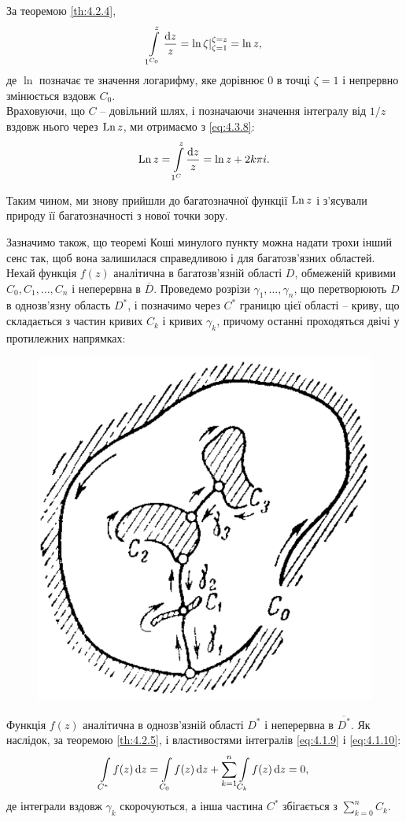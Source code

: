 \begin{example}
	За теоремою \ref{th:4.2.4}, 
	\begin{equation}
		\label{eq:4.3.8}
		\displaystyle\int\limits_{1^{C_0}}^z \frac{\mathop{}\!\mathrm{d} z}{z} = \ln \zeta|_{\zeta=1}^{\zeta=z} = \ln z,
	\end{equation}
	де $\ln$ позначає те значення логарифму, яке дорівнює 0 в точці $\zeta = 1$ і непрервно змінюється вздовж $C_0$. \\

	Враховуючи, що $C$ -- довільний шлях, і позначаючи значення інтегралу від $1/z$ вздовж нього через $\operatorname{Ln} z$, ми отримаємо з \eqref{eq:4.3.8}:
	\begin{equation}
		\label{eq:4.3.9}
		\operatorname{Ln} z = \displaystyle\int\limits_{1^C}^z \frac{\mathop{}\!\mathrm{d} z}{z} = \ln z + 2 k \pi i.
	\end{equation}

	Таким чином, ми знову прийшли до багатозначної функції $\operatorname{Ln} z$ і з'ясували природу її багатозначності з нової точки зору.
\end{example}

Зазначимо також, що теоремі Коші минулого пункту можна надати трохи інший сенс так, щоб вона залишилася справедливою і для багатозв'язних областей. Нехай функція $f(z)$ аналітична в багатозв'язній області $D$, обмеженій кривими $C_0, C_1, \ldots, C_n$ і неперервна в $\overline{D}$. Проведемо розрізи $\gamma_1, \ldots, \gamma_n$, що перетворюють $D$ в однозв'язну область $D^*$, і позначимо через $C^*$ границю цієї області -- криву, що складається з частин кривих $C_k$ і кривих $\gamma_k$, причому останні проходяться двічі у протилежних напрямках:

\begin{figure}[H]
	\centering
	\includegraphics[width=.4\linewidth]{mal-23.png}
\end{figure}

Функція $f(z)$ аналітична в однозв'язній області $D^*$ і неперервна в $\overline{D^*}$. Як наслідок, за теоремою \ref{th:4.2.5}, і властивостями інтегралів \eqref{eq:4.1.9} і \eqref{eq:4.1.10}:
\begin{equation}
\label{eq:4.3.10}
\displaystyle\int\limits_{C^*} f(z) \mathop{}\!\mathrm{d} z = \displaystyle\int\limits_{C_0} f(z) \mathop{}\!\mathrm{d} z + \displaystyle\sum\limits_{k = 1}^n \displaystyle\int\limits_{C_k} f(z) \mathop{}\!\mathrm{d} z = 0,
\end{equation}
де інтеграли вздовж $\gamma_k$ скорочуються, а інша частина $C^*$ збігається з $\sum_{k=0}^n C_k$. \\

